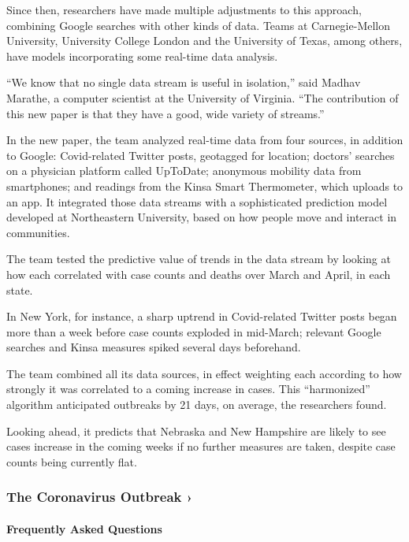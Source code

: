 Since then, researchers have made multiple adjustments to this approach,
combining Google searches with other kinds of data. Teams at
Carnegie-Mellon University, University College London and the University
of Texas, among others, have models incorporating some real-time data
analysis.

``We know that no single data stream is useful in isolation,'' said
Madhav Marathe, a computer scientist at the University of Virginia.
``The contribution of this new paper is that they have a good, wide
variety of streams.''

In the new paper, the team analyzed real-time data from four sources, in
addition to Google: Covid-related Twitter posts, geotagged for location;
doctors' searches on a physician platform called UpToDate; anonymous
mobility data from smartphones; and readings from the Kinsa Smart
Thermometer, which uploads to an app. It integrated those data streams
with a sophisticated prediction model developed at Northeastern
University, based on how people move and interact in communities.

The team tested the predictive value of trends in the data stream by
looking at how each correlated with case counts and deaths over March
and April, in each state.

In New York, for instance, a sharp uptrend in Covid-related Twitter
posts began more than a week before case counts exploded in mid-March;
relevant Google searches and Kinsa measures spiked several days
beforehand.

The team combined all its data sources, in effect weighting each
according to how strongly it was correlated to a coming increase in
cases. This ``harmonized'' algorithm anticipated outbreaks by 21 days,
on average, the researchers found.

Looking ahead, it predicts that Nebraska and New Hampshire are likely to
see cases increase in the coming weeks if no further measures are taken,
despite case counts being currently flat.

\href{https://www.nytimes.com/news-event/coronavirus?action=click\&pgtype=Article\&state=default\&region=MAIN_CONTENT_3\&context=storylines_faq}{}

\hypertarget{the-coronavirus-outbreak-}{%
\subsubsection{The Coronavirus Outbreak
›}\label{the-coronavirus-outbreak-}}

\hypertarget{frequently-asked-questions}{%
\paragraph{Frequently Asked
Questions}\label{frequently-asked-questions}}

